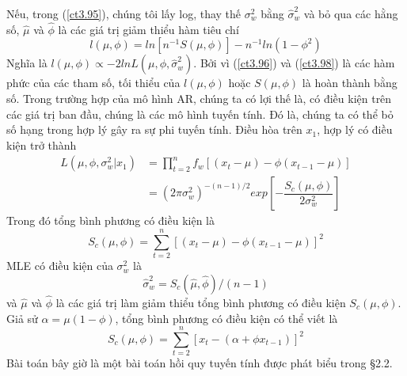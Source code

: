 \documentclass[12pt, a4paper,oneside]{book}
\theoremstyle{definition}
\begin{document}
Nếu, trong (\ref{ct3.95}), chúng tôi lấy log, thay thế $\sigma^{2}_{w}$ bằng $\hat{\sigma}^{2}_{w}$ và bỏ qua các hằng số, $\hat{\mu}$ và $\hat{\phi}$ là các giá trị giảm thiểu hàm tiêu chí 
\begin{equation}
l(\mu, \phi)=ln[n^{-1}S(\mu,\phi)]-n^{-1}ln(1-\phi^{2}) \label{ct3.98}
\end{equation}
Nghĩa là $l(\mu,\phi)\propto-2lnL(\mu,\phi,\hat{\sigma}^{2}_{w})$. Bởi vì (\ref{ct3.96}) và (\ref{ct3.98}) là các hàm phức của các tham số, tối thiểu của $l(\mu,\phi)$ hoặc $S(\mu,\phi)$ là hoàn thành bằng số. Trong trường hợp của mô hình AR, chúng ta có lợi thế là, có điều kiện trên các giá trị ban đầu, chúng là các mô hình tuyến tính. Đó là, chúng ta có thể bỏ số hạng trong hợp lý gây ra sự phi tuyến tính. Điều hòa trên $x_{1}$, hợp lý có điều kiện trở thành 
\begin{align}
L(\mu,\phi,{\sigma}^{2}_{w}|x_{1})&=\prod_{t=2}^{n}f_{w}[(x_{t}-\mu)-\phi(x_{t-1}-\mu)]\\
&=(2\pi \sigma^{2}_{w})^{-(n-1)/2}exp[-\dfrac{S_{c}(\mu,\phi)}{2\sigma^{2}_{w}}]  \label{ct3.99}
\end{align}
Trong đó tổng bình phương có điều kiện là
\begin{equation}
S_{c}(\mu,\phi)=\sum_{t=2}^{n}[(x_{t}-\mu)-\phi(x_{t-1}-\mu)]^{2} \label{ct3.100}
\end{equation}
MLE có điều kiện của $\sigma^{2}_{w}$ là
\begin{equation}
\hat{\sigma}^{2}_{w}=S_{c}(\hat{\mu},\hat{\phi})/(n-1) \label{ct3.101}
\end{equation}
và $\hat{\mu}$ và $\hat{\phi}$ là các giá trị làm giảm thiểu tổng bình phương có điều kiện $S_{c}(\mu,\phi)$. Giả sử $\alpha=\mu(1-\phi)$, tổng bình phương có điều kiện có thể viết là
\begin{equation}
S_{c}(\mu,\phi)=\sum_{t=2}^{n}[x_{t}-(\alpha+\phi x_{t-1})]^{2} \label{ct3.102}
\end{equation}
Bài toán bây giờ là một bài toán hồi quy tuyến tính được phát biểu trong §2.2. 
\end{document}
